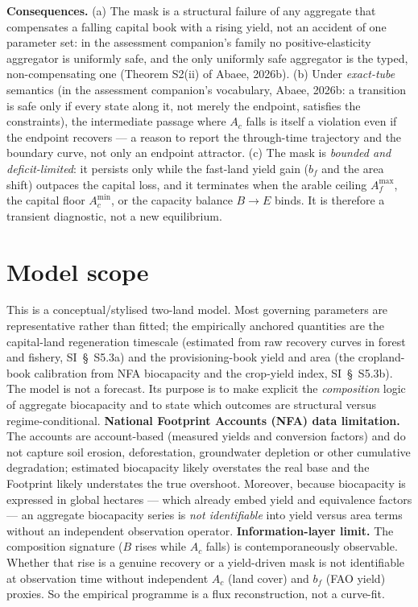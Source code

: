 \documentclass[11pt]{article}
\begin{document}
\noindent\textbf{Consequences.} (a) The mask is a structural failure of any aggregate that compensates a falling capital book with a rising yield, not an accident of one parameter set: in the assessment companion's family no positive-elasticity aggregator is uniformly safe, and the only uniformly safe aggregator is the typed, non-compensating one (Theorem S2(ii) of Abaee, 2026b). (b) Under \emph{exact-tube} semantics (in the assessment companion's vocabulary, Abaee, 2026b: a transition is safe only if every state along it, not merely the endpoint, satisfies the constraints), the intermediate passage where $A_c$ falls is itself a violation even if the endpoint recovers --- a reason to report the through-time trajectory and the boundary curve, not only an endpoint attractor. (c) The mask is \emph{bounded and deficit-limited}: it persists only while the fast-land yield gain ($b_f$ and the area shift) outpaces the capital loss, and it terminates when the arable ceiling $A_f^{\max}$, the capital floor $A_c^{\min}$, or the capacity balance $B\to E$ binds. It is therefore a transient diagnostic, not a new equilibrium.

\section{Model scope}

This is a conceptual/stylised two-land model. Most governing parameters are representative rather than fitted; the empirically anchored quantities are the capital-land regeneration timescale (estimated from raw recovery curves in forest and fishery, SI~\S\ S5.3a) and the provisioning-book yield and area (the cropland-book calibration from NFA biocapacity and the crop-yield index, SI~\S\ S5.3b). The model is not a forecast. Its purpose is to make explicit the \emph{composition} logic of aggregate biocapacity and to state which outcomes are structural versus regime-conditional. \textbf{National Footprint Accounts (NFA) data limitation.} The accounts are account-based (measured yields and conversion factors) and do not capture soil erosion, deforestation, groundwater depletion or other cumulative degradation; estimated biocapacity likely overstates the real base and the Footprint likely understates the true overshoot. Moreover, because biocapacity is expressed in global hectares --- which already embed yield and equivalence factors --- an aggregate biocapacity series is \emph{not identifiable} into yield versus area terms without an independent observation operator. \textbf{Information-layer limit.} The composition signature ($B$ rises while $A_c$ falls) is contemporaneously observable. Whether that rise is a genuine recovery or a yield-driven mask is not identifiable at observation time without independent $A_c$ (land cover) and $b_f$ (FAO yield) proxies. So the empirical programme is a flux reconstruction, not a curve-fit.
\end{document}
